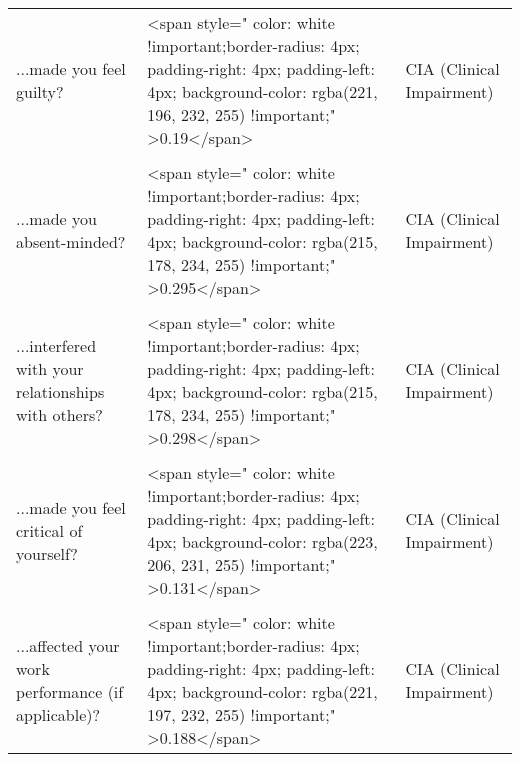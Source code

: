 \documentclass[border=1mm]{standalone}
\begin{document}
\begin{longtable}{lll}
...made you feel guilty? & <span style="     color: white !important;border-radius: 4px; padding-right: 4px; padding-left: 4px; background-color: rgba(221, 196, 232, 255) !important;" >0.19</span> & CIA (Clinical Impairment)\\
\cellcolor{gray!10}{...interfered with you doing things you used to enjoy?} & \cellcolor{gray!10}{<span style="     color: white !important;border-radius: 4px; padding-right: 4px; padding-left: 4px; background-color: rgba(222, 201, 232, 255) !important;" >0.161</span>} & \cellcolor{gray!10}{CIA (Clinical Impairment)}\\
\addlinespace
...made you absent-minded? & <span style="     color: white !important;border-radius: 4px; padding-right: 4px; padding-left: 4px; background-color: rgba(215, 178, 234, 255) !important;" >0.295</span> & CIA (Clinical Impairment)\\
\cellcolor{gray!10}{...made you feel a failure?} & \cellcolor{gray!10}{<span style="     color: white !important;border-radius: 4px; padding-right: 4px; padding-left: 4px; background-color: rgba(218, 187, 233, 255) !important;" >0.247</span>} & \cellcolor{gray!10}{CIA (Clinical Impairment)}\\
...interfered with your relationships with others? & <span style="     color: white !important;border-radius: 4px; padding-right: 4px; padding-left: 4px; background-color: rgba(215, 178, 234, 255) !important;" >0.298</span> & CIA (Clinical Impairment)\\
\cellcolor{gray!10}{...made you worry?} & \cellcolor{gray!10}{<span style="     color: white !important;border-radius: 4px; padding-right: 4px; padding-left: 4px; background-color: rgba(218, 188, 233, 255) !important;" >0.239</span>} & \cellcolor{gray!10}{CIA (Clinical Impairment)}\\
...made you feel critical of yourself? & <span style="     color: white !important;border-radius: 4px; padding-right: 4px; padding-left: 4px; background-color: rgba(223, 206, 231, 255) !important;" >0.131</span> & CIA (Clinical Impairment)\\
\addlinespace
\cellcolor{gray!10}{...stopped you going out with others?} & \cellcolor{gray!10}{<span style="     color: white !important;border-radius: 4px; padding-right: 4px; padding-left: 4px; background-color: rgba(219, 190, 233, 255) !important;" >0.226</span>} & \cellcolor{gray!10}{CIA (Clinical Impairment)}\\
...affected your work performance (if applicable)? & <span style="     color: white !important;border-radius: 4px; padding-right: 4px; padding-left: 4px; background-color: rgba(221, 197, 232, 255) !important;" >0.188</span> & CIA (Clinical Impairment)\\

\end{longtable}
\end{document}
